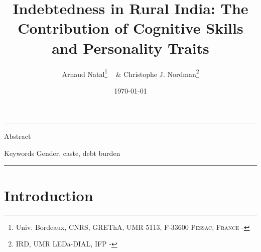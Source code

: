 \documentclass[a4paper, 11pt, onecolumn]{article}
\title{Indebtedness in Rural India: The Contribution of Cognitive Skills and Personality Traits}
\author{Arnaud Natal\thanks{Univ. Bordeaux, CNRS, GREThA, UMR 5113, F-33600 \textsc{Pessac, France} - \email{arnaud.natal@u-bordeaux.fr}} ~ \& Christophe J. Nordman\thanks{IRD, UMR LEDa-DIAL, IFP - \email{nordman@dial.prd}} }
\date{\today}
\begin{document}
\maketitle

\hrule 
\vspace{0.3cm}

\begin{resab}{Abstract}

\end{resab}

\begin{motkey}{Keywords}
Gender, caste, debt burden
\end{motkey}


\hrule

\section{Introduction}
\label{Introduction}

\end{document}
